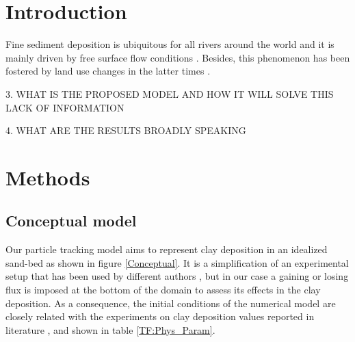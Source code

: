 \documentclass[draft,linenumbers]{agujournal2018}
\begin{document}
\section{Introduction} \label{Introduction}

Fine sediment deposition is ubiquitous for all rivers around the world and it is mainly driven by free surface flow conditions \citep{Packman2000}. Besides, this phenomenon has been fostered by land use changes in the latter times \citep{Wohl2015}.   


3. WHAT IS THE PROPOSED MODEL AND HOW IT WILL SOLVE THIS LACK OF INFORMATION

4. WHAT ARE THE RESULTS BROADLY SPEAKING

\section{Methods} \label{Methods}

\subsection{Conceptual model} \label{Conceptual_Model}


Our particle tracking model aims to represent clay deposition in an idealized sand-bed as shown in figure \ref{Conceptual}. It is a simplification of an experimental setup that has been used by different authors \citep{Elliott1997b,Fox2014,Fox2018}, but in our case a gaining or losing flux is imposed at the bottom of the domain to assess its effects in the clay deposition. As a consequence, the initial conditions of the numerical model are closely related with the experiments on clay deposition values reported in literature \citep{Packman2000,Fox2014,Fox2018}, and shown in table \ref{TF:Phys_Param}.
\end{document}

